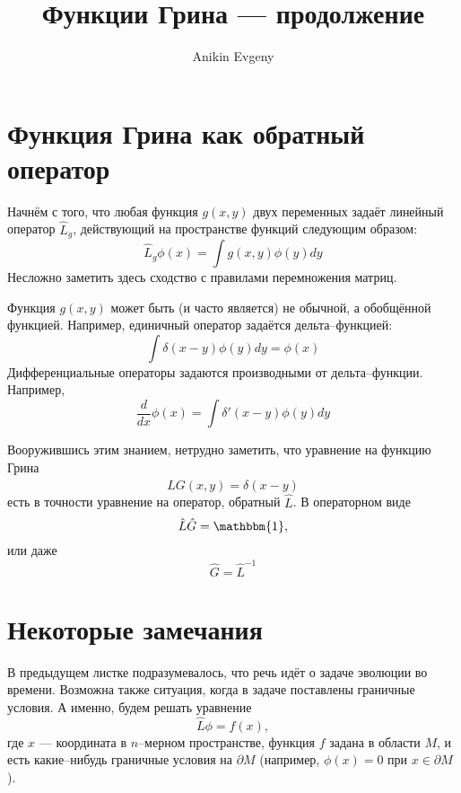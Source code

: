 \documentclass{article}
\title{Функции Грина --- продолжение}
\author{Anikin Evgeny}
\begin{document}
\maketitle
\section{Функция Грина как обратный оператор}
Начнём с того, что любая функция $g(x,y)$ 
двух переменных задаёт линейный оператор $\hat{L}_g$, действующий 
на пространстве функций следующим образом:
\begin{equation}
    \hat{L}_g\phi(x) = \int  g(x,y) \phi(y) dy
\end{equation}
Несложно заметить здесь сходство с правилами перемножения матриц.

Функция $g(x,y)$ может быть (и часто является) не обычной, а обобщённой функцией. Например,
единичный оператор задаётся дельта--функцией:
\begin{equation}
    \int \delta(x-y) \phi(y) dy = \phi(x)
\end{equation}
Дифференциальные операторы задаются производными от дельта--функции. Например,
\begin{equation}
    \frac{d}{dx} \phi(x) = \int \delta'(x-y) \phi(y) dy
\end{equation}

Вооружившись этим знанием, нетрудно заметить, что уравнение на функцию Грина
\begin{equation}
    \hat{L}G(x,y) = \delta(x-y)
\end{equation}
есть в точности уравнение на оператор, обратный $\hat{L}$. В операторном виде
\begin{equation}
    \hat{L} \hat{G} = \mathbbm{1},
\end{equation}
или даже 
\begin{equation}
    \hat{G} = \hat{L}^{-1}
\end{equation}

\section{Некоторые замечания}
В предыдущем листке подразумевалось, что речь идёт о задаче эволюции во времени. 
Возможна также ситуация, когда в задаче поставлены граничные условия. А именно, будем решать
уравнение 
\begin{equation}
    \hat{L}\phi = f(x),
\end{equation}
где $x$ --- координата в $n$--мерном пространстве, функция $f$ задана в области
$M$, и есть какие--нибудь граничные условия на $\partial M$ 
(например, $\phi(x) = 0$ при $x \in \partial M$). 
\end{document}
